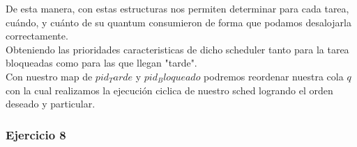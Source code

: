  De esta manera, con estas estructuras nos permiten determinar para cada tarea, cuándo, y cuánto 
de su quantum consumieron de forma que podamos desalojarla correctamente.\\

Obteniendo las prioridades caracteristicas de dicho scheduler tanto para la tarea bloqueadas como para las que llegan "tarde".\\
Con nuestro map de $pid_Tarde$ y $pid_Bloqueado$ podremos reordenar nuestra cola $q$ con la cual realizamos la ejecuci\'on ciclica de nuestro
sched logrando el orden deseado y particular.\\

\subsubsection[Resolución Ejercicio 8]{Ejercicio 8}

